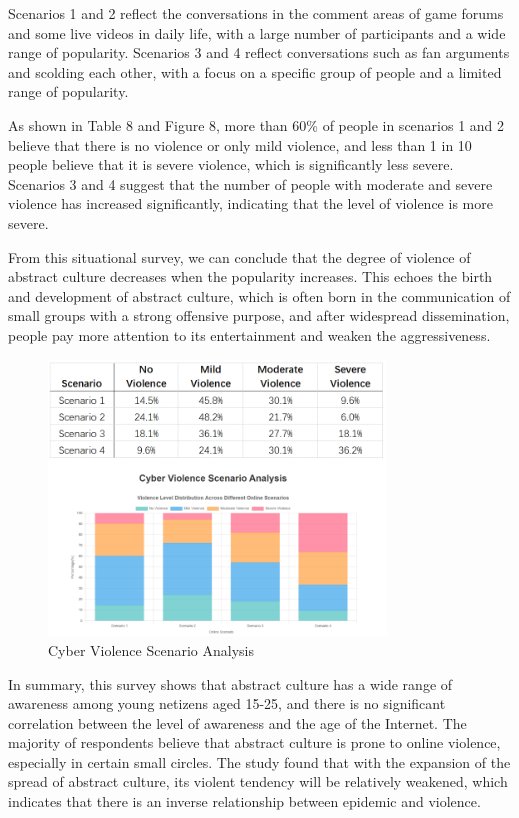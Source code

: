 \documentclass[12pt,a4paper]{ctexart}
\theoremstyle{MyLineTheoremStyle}
\theoremstyle{MyBlockTheoremStyle}
\theoremstyle{MySubsubsectionStyle}
\begin{document}
Scenarios 1 and 2 reflect the conversations in the comment areas of game forums and some live videos in daily life, with a large number of participants and a wide range of popularity. Scenarios 3 and 4 reflect conversations such as fan arguments and scolding each other, with a focus on a specific group of people and a limited range of popularity.

As shown in Table 8 and Figure 8, more than 60\% of people in scenarios 1 and 2 believe that there is no violence or only mild violence, and less than 1 in 10 people believe that it is severe violence, which is significantly less severe. Scenarios 3 and 4 suggest that the number of people with moderate and severe violence has increased significantly, indicating that the level of violence is more severe.

From this situational survey, we can conclude that the degree of violence of abstract culture decreases when the popularity increases. This echoes the birth and development of abstract culture, which is often born in the communication of small groups with a strong offensive purpose, and after widespread dissemination, people pay more attention to its entertainment and weaken the aggressiveness.

\begin{figure}[htbp]
    \centering
    \includegraphics[width=0.8\textwidth]{img/scenario_vs_net_violence.png}
    \caption{Cyber Violence Scenario Analysis}
    \label{fig:scenario_vs_net_violence}
\end{figure}
\newpage

In summary, this survey shows that abstract culture has a wide range of awareness among young netizens aged 15-25, and there is no significant correlation between the level of awareness and the age of the Internet. The majority of respondents believe that abstract culture is prone to online violence, especially in certain small circles. The study found that with the expansion of the spread of abstract culture, its violent tendency will be relatively weakened, which indicates that there is an inverse relationship between epidemic and violence.
\end{document}
